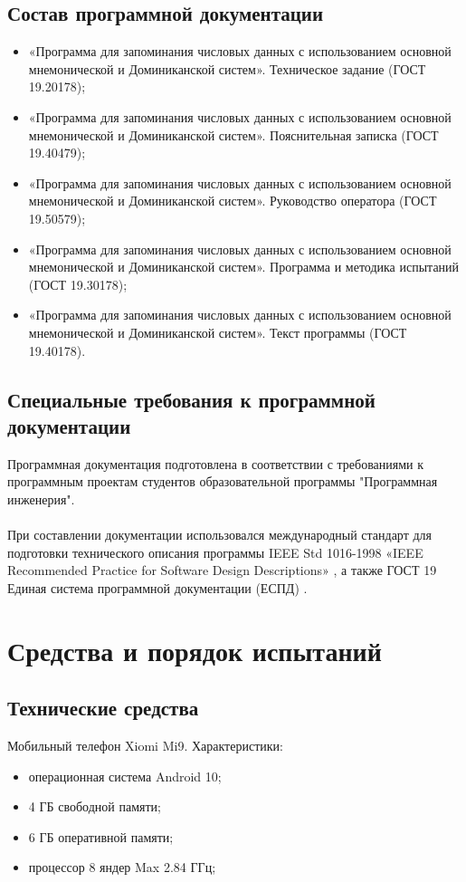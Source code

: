 \documentclass[draft]{article}
\begin{document}
\subsection{Состав программной документации}
\begin{itemize}
\item «Программа для запоминания числовых данных с использованием основной мнемонической и Доминиканской систем». Техническое задание (ГОСТ 19.20178);
\item «Программа для запоминания числовых данных с использованием основной мнемонической и Доминиканской систем». Пояснительная записка (ГОСТ 19.40479);
\item «Программа для запоминания числовых данных с использованием основной мнемонической и Доминиканской систем». Руководство оператора (ГОСТ 19.50579);
\item «Программа для запоминания числовых данных с использованием основной мнемонической и Доминиканской систем». Программа и методика испытаний (ГОСТ 19.30178);
\item «Программа для запоминания числовых данных с использованием основной мнемонической и Доминиканской систем». Текст программы (ГОСТ 19.40178).
\end{itemize}
\subsection{Специальные требования к программной документации}
Программная документация подготовлена в соответствии с требованиями к программным проектам студентов образовательной программы "{}Программная инженерия"{}.\\
~\\
При составлении документации использовался международный стандарт для подготовки технического описания программы IEEE Std 1016-1998 «IEEE Recommended Practice for Software Design Descriptions» \cite{litlink1}, а также ГОСТ 19 Единая система программной документации (ЕСПД) \cite{litlink2}.
\newpage
\section {Средства и порядок испытаний}
\subsection {Технические средства}
Мобильный телефон Xiomi Mi9. Характеристики:
\begin{itemize}
\item операционная система Android 10;
\item 4 ГБ свободной памяти;
\item 6 ГБ оперативной памяти;
\item процессор 8 яндер Max 2.84 ГГц;
\end{itemize}
\end{document}
